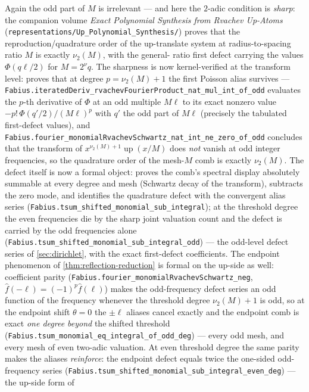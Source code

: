 \documentclass[11pt,oneside]{article}
\numberwithin{equation}{section}
\theoremstyle{definition}
\theoremstyle{remark}
\newcommand{\Up}{\operatorname{up}}
\newcommand{\vtwo}{\nu_2}
\begin{document}
Again the odd part of $M$ is irrelevant --- and here the $2$-adic
condition is \emph{sharp}: the companion volume \emph{Exact Polynomial
Synthesis from Rvachev Up-Atoms}
(\nolinkurl{representations/Up_Polynomial_Synthesis/}) proves that the
reproduction/quadrature order of the up-translate system at
radius-to-spacing ratio $M$ is exactly $\vtwo(M)$, with the general-%
ratio first defect carrying the values $\Phi(q\ell/2)$ for $M=2^{\nu}q$.  The
sharpness is now kernel-verified at the transform level: 
proves that at degree $p=\vtwo(M)+1$ the first Poisson alias survives ---
\nolinkurl{Fabius.iteratedDeriv_rvachevFourierProduct_nat_mul_int_of_odd} evaluates the
$p$-th derivative of $\Phi$ at an odd multiple $M\ell$ to its exact nonzero value
$-p!\,\Phi(q'/2)/(M\ell)^p$ with $q'$ the odd part of $M\ell$ (precisely the tabulated
first-defect values), and
\nolinkurl{Fabius.fourier_monomialRvachevSchwartz_nat_int_ne_zero_of_odd} concludes that
the transform of $x^{\vtwo(M)+1}\Up(x/M)$ does \emph{not} vanish at odd integer
frequencies, so the quadrature order of the mesh-$M$ comb is exactly $\vtwo(M)$.
The defect itself is now a formal object:  proves the comb's
spectral display absolutely summable at every degree and mesh (Schwartz decay of the
transform), subtracts the zero mode, and identifies the quadrature defect with the
convergent alias series
(\nolinkurl{Fabius.tsum_shifted_monomial_sub_integral}); at the threshold degree the even
frequencies die by the sharp joint valuation count and the defect is carried by the
odd frequencies alone (\nolinkurl{Fabius.tsum_shifted_monomial_sub_integral_odd}) --- the
odd-level defect series of \cref{sec:dirichlet}, with the exact first-defect
coefficients.  The endpoint phenomenon of \cref{thm:reflection-reduction} is formal on
the up-side as well: coefficient parity
(\nolinkurl{Fabius.fourier_monomialRvachevSchwartz_neg}, $\hat f(-\ell)=(-1)^p\hat f(\ell)$)
makes the odd-frequency defect series an odd function of the frequency whenever the
threshold degree $\vtwo(M)+1$ is odd, so at the endpoint shift $\theta=0$ the
$\pm\ell$ aliases cancel exactly and the endpoint comb is exact \emph{one degree
beyond} the shifted threshold
(\nolinkurl{Fabius.tsum_monomial_eq_integral_of_odd_deg}) --- every odd mesh, and every
mesh of even two-adic valuation.  At even threshold degree the same parity makes the
aliases \emph{reinforce}: the endpoint defect equals twice the one-sided odd-frequency
series
(\nolinkurl{Fabius.tsum_shifted_monomial_sub_integral_even_deg}) --- the up-side form of
\end{document}
